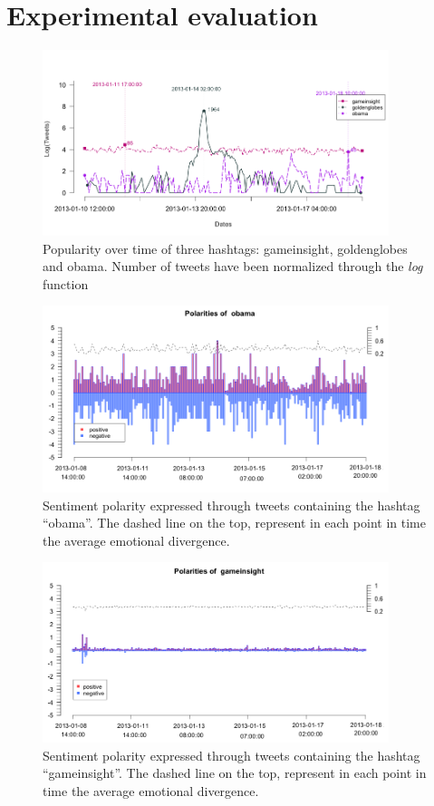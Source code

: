 \section{Experimental evaluation}
\label{sec:results}
\begin{figure}[!Ht]
\includegraphics[width=0.9\textwidth]{images/3-plots.png} 
\caption{Popularity over time of three hashtags: gameinsight, goldenglobes and obama. Number of tweets have been normalized through the \emph{log} function}
\label{fig:trends}
\end{figure}

\begin{figure}[!Ht]
\includegraphics[width=0.9\textwidth]{images/obama-sentiment.png} 
\caption{Sentiment polarity expressed through tweets containing the hashtag ``obama''. The dashed line on the top, represent in each point in time the average emotional divergence.}
\label{fig:obama-sentiment}
\end{figure}

\begin{figure}[!Ht]
\includegraphics[width=0.9\textwidth]{images/game-sentiment.png} 
\caption{Sentiment polarity expressed through tweets containing the hashtag ``gameinsight''. The dashed line on the top, represent in each point in time the average emotional divergence.}
\label{fig:game-sentiment}
\end{figure}



